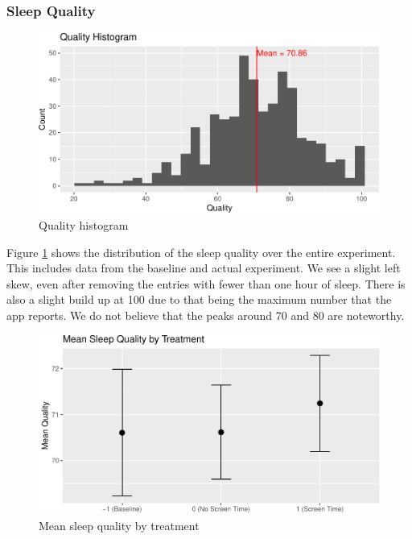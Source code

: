 \documentclass[12pt,]{article}
\begin{document}
\subsubsection{Sleep Quality}\label{sleep-quality}

\begin{figure}
\centering
\includegraphics{report_files/figure-latex/quality_histogram-1.pdf}
\caption{\label{fig:quality_histogram} Quality histogram}
\end{figure}

Figure \ref{fig:quality_histogram} shows the distribution of the sleep
quality over the entire experiment. This includes data from the baseline
and actual experiment. We see a slight left skew, even after removing
the entries with fewer than one hour of sleep. There is also a slight
build up at 100 due to that being the maximum number that the app
reports. We do not believe that the peaks around 70 and 80 are
noteworthy.

\begin{figure}
\centering
\includegraphics{report_files/figure-latex/quality_by_treatment_fig-1.pdf}
\caption{\label{fig:quality_by_treatment_fig} Mean sleep quality by
treatment}
\end{figure}
\end{document}

